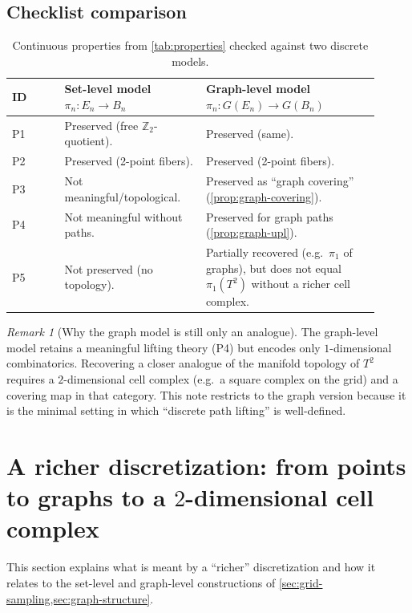 \documentclass[11pt,a4paper]{article}
\theoremstyle{definition}
\theoremstyle{remark}
\newtheorem{remark}[theorem]{Remark}
\begin{document}
\subsection{Checklist comparison}
\label{sec:checklist-comparison}

\begin{table}[h]
\centering
\begin{tabular}{p{0.13\linewidth} p{0.35\linewidth} p{0.43\linewidth}}
\hline
\textbf{ID} & \textbf{Set-level model \(\pi_n:E_n\to B_n\)} & \textbf{Graph-level model \(\pi_n:G(E_n)\to G(B_n)\)}\\
\hline
P1 & Preserved (free \(\mathbb{Z}_2\)-quotient). & Preserved (same).\\
P2 & Preserved (2-point fibers). & Preserved (2-point fibers).\\
P3 & Not meaningful/topological. & Preserved as ``graph covering'' (\cref{prop:graph-covering}).\\
P4 & Not meaningful without paths. & Preserved for graph paths (\cref{prop:graph-upl}).\\
P5 & Not preserved (no topology). & Partially recovered (e.g.\ \(\pi_1\) of graphs), but does not equal \(\pi_1(T^2)\) without a richer cell complex.\\
\hline
\end{tabular}
\caption{Continuous properties from \cref{tab:properties} checked against two discrete models.}
\label{tab:discrete-comparison}
\end{table}

\begin{remark}[Why the graph model is still only an analogue]
\label{rem:graph-only-analogue}
The graph-level model retains a meaningful lifting theory (P4) but encodes only \(1\)-dimensional combinatorics. Recovering a closer analogue of the manifold topology of \(T^2\) requires a \(2\)-dimensional cell complex (e.g.\ a square complex on the grid) and a covering map in that category. This note restricts to the graph version because it is the minimal setting in which ``discrete path lifting'' is well-defined.
\end{remark}

\section{A richer discretization: from points to graphs to a \(2\)-dimensional cell complex}
\label{sec:richer-cell-complex}

This section explains what is meant by a ``richer'' discretization and how it relates to the set-level and graph-level constructions of \cref{sec:grid-sampling,sec:graph-structure}.
\end{document}
